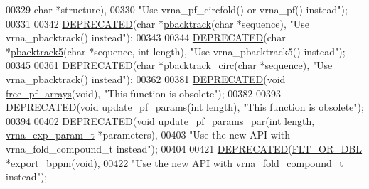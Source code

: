 \begin{DoxyCode}
00329                       \textcolor{keywordtype}{char} *structure),
00330 \textcolor{stringliteral}{"Use vrna\_pf\_circfold() or vrna\_pf() instead"});
00331 
00342 \mbox{\hyperlink{part__func_8h_aab347a3c03fbe8e7319551b9fa0cce4a}{DEPRECATED}}(\textcolor{keywordtype}{char}    *\mbox{\hyperlink{group__subopt__stochbt_gac03ca6db186bb3bf0a2a326d7fb3ba03}{pbacktrack}}(\textcolor{keywordtype}{char} *sequence), \textcolor{stringliteral}{"Use vrna\_pbacktrack() instead"});
00343 
00344 \mbox{\hyperlink{part__func_8h_aab347a3c03fbe8e7319551b9fa0cce4a}{DEPRECATED}}(\textcolor{keywordtype}{char}    *\mbox{\hyperlink{part__func_8h_af2e614b8beb4ddf3e8751433b76f39db}{pbacktrack5}}(\textcolor{keywordtype}{char} *sequence, \textcolor{keywordtype}{int} length), \textcolor{stringliteral}{"Use vrna\_pbacktrack5()
       instead"});
00345 
00361 \mbox{\hyperlink{part__func_8h_aab347a3c03fbe8e7319551b9fa0cce4a}{DEPRECATED}}(\textcolor{keywordtype}{char}    *\mbox{\hyperlink{group__subopt__stochbt_ga00474051204ac9ad576b3e45174d03ff}{pbacktrack\_circ}}(\textcolor{keywordtype}{char} *sequence), \textcolor{stringliteral}{"Use vrna\_pbacktrack()
       instead"});
00362 
00381 \mbox{\hyperlink{part__func_8h_aab347a3c03fbe8e7319551b9fa0cce4a}{DEPRECATED}}(\textcolor{keywordtype}{void}  \mbox{\hyperlink{group__pf__fold_gae73db3f49a94f0f72e067ecd12681dbd}{free\_pf\_arrays}}(\textcolor{keywordtype}{void}), \textcolor{stringliteral}{"This function is obsolete"});
00382 
00393 \mbox{\hyperlink{part__func_8h_aab347a3c03fbe8e7319551b9fa0cce4a}{DEPRECATED}}(\textcolor{keywordtype}{void}  \mbox{\hyperlink{group__pf__fold_ga384e927890f9c034ff09fa66da102d28}{update\_pf\_params}}(\textcolor{keywordtype}{int} length), \textcolor{stringliteral}{"This function is obsolete"});
00394 
00402 \mbox{\hyperlink{part__func_8h_aab347a3c03fbe8e7319551b9fa0cce4a}{DEPRECATED}}(\textcolor{keywordtype}{void} \mbox{\hyperlink{group__pf__fold_gaafe2d1b21f5418b123b088aa395e827d}{update\_pf\_params\_par}}(\textcolor{keywordtype}{int} length, 
      \mbox{\hyperlink{group__energy__parameters_structvrna__exp__param__s}{vrna\_exp\_param\_t}} *parameters),
00403 \textcolor{stringliteral}{"Use the new API with vrna\_fold\_compound\_t instead"});
00404 
00421 \mbox{\hyperlink{part__func_8h_aab347a3c03fbe8e7319551b9fa0cce4a}{DEPRECATED}}(\mbox{\hyperlink{group__data__structures_ga31125aeace516926bf7f251f759b6126}{FLT\_OR\_DBL}}  *\mbox{\hyperlink{group__pf__fold_gac5ac7ee281aae1c5cc5898a841178073}{export\_bppm}}(\textcolor{keywordtype}{void}),
00422 \textcolor{stringliteral}{"Use the new API with vrna\_fold\_compound\_t instead"});

\end{DoxyCode}
